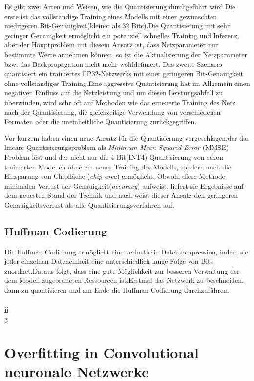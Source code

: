 \documentclass[12pt,a4paper]{scrartcl}
\numberwithin{equation}{section}
\begin{document}
Es gibt zwei Arten und Weisen, wie die Quantisierung durchgeführt wird.Die erste ist das vollständige Training eines Modells mit einer gewünschten niedrigeren Bit-Genauigkeit(kleiner als 32 Bits).Die Quantisierung mit sehr geringer Genauigkeit ermöglicht ein potenziell schnelles Training und Inferenz, aber der Hauptproblem mit diesem Ansatz ist, dass Netzparameter nur bestimmte Werte annehmen können, so ist die Aktualisierung der Netzparameter bzw. das Backpropagation nicht mehr wohldefiniert.
Das zweite Szenario  quantisiert ein trainiertes FP32-Netzwerks mit einer geringeren Bit-Genauigkeit ohne vollständiges Training.Eine aggressive Quantisierung hat im Allgemein einen negativen Einfluss auf die Netzleistung und um diesen Leistungsabfall zu überwinden, wird sehr oft auf Methoden wie das erneuerte Training des Netz nach der Quantisierung, die gleichzeitige Verwendung von verschiedenen Formaten oder die uneinheitliche Quantisierung zurückgegriffen.

Vor kurzem haben \cite[Yoni et al]{quantizationYoni} einen neue Ansatz für die Quantisierung vorgeschlagen,der das lineare Quantisierungsproblem als \textit{Minimum Mean Squared Error} (MMSE) Problem löst und der nicht nur die 4-Bit(INT4) Quantisierung von schon trainierten Modellen ohne ein neues Training des Modells, sondern auch die Einsparung von Chipfläche (\textit{chip area}) ermöglicht. Obwohl diese Methode  minimalen Verlust der Genauigkeit(\textit{accuracy}) aufweist, liefert sie Ergebnisse auf dem neuesten Stand der Technik und nach \cite{quantizationYoni} weist dieser Ansatz den geringeren Genauigkeitsverlust als alle Quantisierungsverfahren auf.

\subsection{Huffman Codierung}
Die Huffman-Codierung ermöglicht eine verlustfreie Datenkompression, indem sie jeder einzelnen Dateneinheit  eine unterschiedlich lange Folge von Bits zuordnet.Daraus folgt, dass eine gute Möglichkeit zur besseren Verwaltung der dem Modell zugeordneten Ressourcen ist:Erstmal das Netzwerk zu beschneiden, dann zu quantisieren und am Ende die Huffman-Codierung durchzuführen. \\ \\ jj\\g\\

 \section{Overfitting in Convolutional   neuronale Netzwerke}
\end{document}
